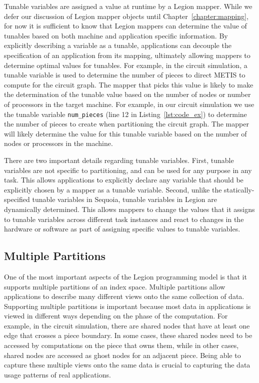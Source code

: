 Tunable variables are assigned a 
value at runtime by a Legion mapper. While we defer our 
discussion of Legion mapper objects until 
Chapter~\ref{chapter:mapping}, for now it is sufficient 
to know that Legion mappers can determine the value of 
tunables based on both machine and application specific 
information. By explicitly describing 
a variable as a tunable, applications can decouple the
specification of an application from its mapping,
ultimately allowing mappers to determine optimal values
for tunables. For example, in the circuit simulation, a
tunable variable is used to determine the number of
pieces to direct METIS to compute for the circuit
graph. The mapper that picks this value is likely
to make the determination of the tunable value based
on the number of nodes or number of processors in 
the target machine. For example, in our circuit
simulation we use the tunable variable {\tt num\_pieces}
(line 12 in Listing~\ref{lst:code_ex}) to determine
the number of pieces to create when partitioning
the circuit graph. The mapper will likely determine
the value for this tunable variable based on 
the number of nodes or processors in the machine.

There are two important details regarding tunable
variables.  First, tunable variables are not specific
to partitioning, and can be used for any purpose in
any task. This allows applications to explicitly declare
any variable that should be explicitly chosen by
a mapper as a tunable variable. Second, unlike the 
statically-specified tunable variables in Sequoia,
tunable variables in Legion are dynamically determined. 
This allows mappers to change the values that it assigns to
tunable variables across different task instances
and react to changes in the hardware or software
as part of assigning specific values to tunable variables.

\subsection{Multiple Partitions}
\label{subsec:multiple}
One of the most important aspects of the Legion
programming model is that it supports multiple
partitions of an index space.  Multiple partitions
allow applications to describe many different
views onto the same collection of data. Supporting
multiple partitions is
important because most data in applications is
viewed in different ways depending on the phase
of the computation. For example, in the circuit 
simulation, there are shared nodes that have at
least one edge that crosses a piece boundary.  In
some cases, these shared nodes need to be accessed
by computations on the piece that owns them, while
in other cases, shared nodes are accessed as 
ghost nodes for an adjacent piece. Being able to
capture these multiple views onto the same data
is crucial to capturing the data usage patterns
of real applications.

